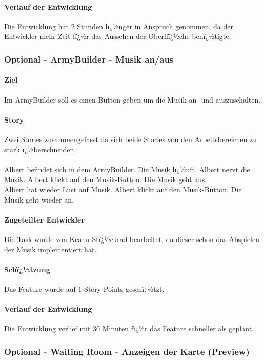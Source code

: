 \documentclass[12pt, titlepage]{scrartcl}
\begin{document}
		\paragraph{Verlauf der Entwicklung} 
		Die Entwicklung hat 2 Stunden lï¿½nger in Anspruch genommen, da der Entwickler mehr Zeit fï¿½r das Aussehen der Oberflï¿½che benï¿½tigte.
		
		\subsubsection{Optional - ArmyBuilder - Musik an/aus}
		\paragraph{Ziel} Im ArmyBuilder soll es einen Button geben um die Musik an- und auszuschalten. 
		\paragraph{Story} Zwei Stories zusammengefasst da sich beide Stories von den Arbeitsbereichen zu stark ï¿½berschneiden. \\ \ \\ Albert befindet sich in dem ArmyBuilder. Die Musik lï¿½uft. Albert nervt die Musik. Albert klickt auf den Musik-Button. Die Musik geht aus. \\ Albert hat wieder Lust auf Musik. Albert klickt auf den Musik-Button. Die Musik geht wieder an.
		\paragraph{Zugeteilter Entwickler} Die Task wurde von Keanu Stï¿½ckrad bearbeitet, da dieser schon das Abspielen der Musik implementiert hat.
		\paragraph{Schï¿½tzung}
		Das Feature wurde auf 1 Story Points geschï¿½tzt.
		\paragraph{Verlauf der Entwicklung} 
		Die Entwicklung verlief mit 30 Minuten fï¿½r das Feature schneller als geplant.
		
		\subsubsection{Optional - Waiting Room - Anzeigen der Karte (Preview)}
\end{document}
